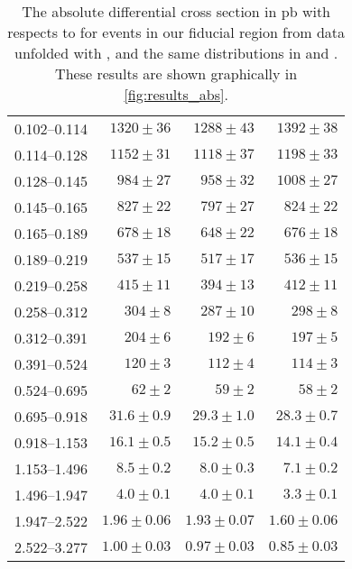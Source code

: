 \begin{table}
\begin{center}
\begin{tabular}{@{}l r r r@{}}
            0.102--0.114  &  $1320  \pm  36$    &  $1288  \pm  43$    &  $1392  \pm  38$    \\
            0.114--0.128  &  $1152  \pm  31$    &  $1118  \pm  37$    &  $1198  \pm  33$    \\
            0.128--0.145  &  $984   \pm  27$    &  $958   \pm  32$    &  $1008  \pm  27$    \\
            0.145--0.165  &  $827   \pm  22$    &  $797   \pm  27$    &  $824   \pm  22$    \\
            0.165--0.189  &  $678   \pm  18$    &  $648   \pm  22$    &  $676   \pm  18$    \\
            0.189--0.219  &  $537   \pm  15$    &  $517   \pm  17$    &  $536   \pm  15$    \\
            0.219--0.258  &  $415   \pm  11$    &  $394   \pm  13$    &  $412   \pm  11$    \\
            0.258--0.312  &  $304   \pm  8$     &  $287   \pm  10$    &  $298   \pm  8$     \\
            0.312--0.391  &  $204   \pm  6$     &  $192   \pm  6$     &  $197   \pm  5$     \\
            0.391--0.524  &  $120   \pm  3$     &  $112   \pm  4$     &  $114   \pm  3$     \\
            0.524--0.695  &  $62    \pm  2$     &  $59    \pm  2$     &  $58    \pm  2$     \\
            0.695--0.918  &  $31.6  \pm  0.9$   &  $29.3  \pm  1.0$   &  $28.3  \pm  0.7$   \\
            0.918--1.153  &  $16.1  \pm  0.5$   &  $15.2  \pm  0.5$   &  $14.1  \pm  0.4$   \\
            1.153--1.496  &  $8.5   \pm  0.2$   &  $8.0   \pm  0.3$   &  $7.1   \pm  0.2$   \\
            1.496--1.947  &  $4.0   \pm  0.1$   &  $4.0   \pm  0.1$   &  $3.3   \pm  0.1$   \\
            1.947--2.522  &  $1.96  \pm  0.06$  &  $1.93  \pm  0.07$  &  $1.60  \pm  0.06$  \\
            2.522--3.277  &  $1.00  \pm  0.03$  &  $0.97  \pm  0.03$  &  $0.85  \pm  0.03$  \\
            \bottomrule
        \end{tabular}
    \end{center}
    \caption[
        The absolute differential cross section in \si{\pico\barn} with
        respects to \phistar for \Ztoee events in our fiducial region from data
        unfolded with \MADGRAPH.
    ]{
        The absolute differential cross section in \si{\pico\barn} with
        respects to \phistar for \Ztoee events in our fiducial region from data
        unfolded with \MADGRAPH, and the same distributions in \MADGRAPH and
        \PPsixZtwo. These results are shown graphically in \cref{fig:results_abs}.
    }
    \label{tab:results_abs}
\end{table}
